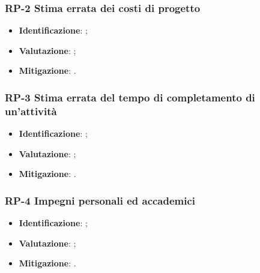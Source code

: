 \subsubsection{RP-2 Stima errata dei costi di progetto}

\begin{itemize}
\setlength\itemsep{0em}
    \item \textbf{Identificazione}: ;
    \item \textbf{Valutazione}: ;
    \item \textbf{Mitigazione}: .
\end{itemize}

\subsubsection{RP-3 Stima errata del tempo di completamento di un'attività}

\begin{itemize}
\setlength\itemsep{0em}
    \item \textbf{Identificazione}: ;
    \item \textbf{Valutazione}: ;
    \item \textbf{Mitigazione}: .
\end{itemize}

\subsubsection{RP-4 Impegni personali ed accademici}

\begin{itemize}
\setlength\itemsep{0em}
    \item \textbf{Identificazione}: ;
    \item \textbf{Valutazione}: ;
    \item \textbf{Mitigazione}: .
\end{itemize}
